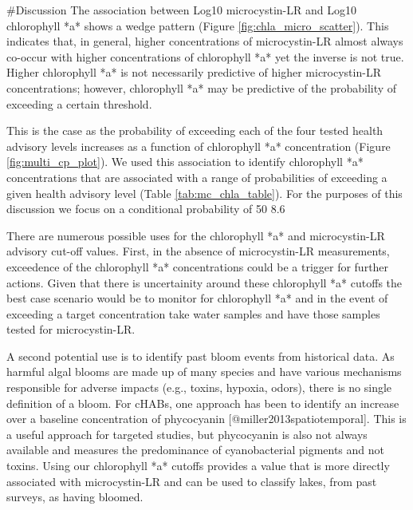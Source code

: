 #Discussion
The association between Log10 microcystin-LR and Log10 chlorophyll *a* shows a wedge pattern (Figure \ref{fig:chla_micro_scatter}).  This indicates that, in general, higher concentrations of microcystin-LR almost always co-occur with higher concentrations of chlorophyll *a* yet the inverse is not true.  Higher chlorophyll *a* is not necessarily predictive of higher microcystin-LR concentrations; however, chlorophyll *a* may be predictive of the probability of exceeding a certain threshold. 

This is the case as the probability of exceeding each of the four tested health advisory levels increases as a function of chlorophyll *a* concentration (Figure \ref{fig:multi_cp_plot}).  We used this association to identify chlorophyll *a* concentrations that are associated with a range of probabilities of exceeding a given health advisory level (Table \ref{tab:mc_chla_table}).  For the purposes of this discussion we focus on a conditional probability of 50%
8.6%

There are numerous possible uses for the chlorophyll *a* and microcystin-LR advisory cut-off values.  First, in the absence of microcystin-LR measurements, exceedence of the chlorophyll *a* concentrations could be a trigger for further actions.  Given that there is uncertainity around these chlorophyll *a* cutoffs the best case scenario would be to monitor for chlorophyll *a* and in the event of exceeding a target concentration take water samples and have those samples tested for microcystin-LR.  

A second potential use is to identify past bloom events from historical data.  As harmful algal blooms are made up of many species and have various mechanisms responsible for adverse impacts (e.g., toxins, hypoxia, odors), there is no single definition of a bloom.  For cHABs, one approach has been to identify an increase over a baseline concentration of phycocyanin [@miller2013spatiotemporal].  This is a useful approach for targeted studies, but phycocyanin is also not always available and measures the predominance of cyanobacterial pigments and not toxins. Using our chlorophyll *a* cutoffs provides a value that is more directly associated with microcystin-LR and can be used to classify lakes, from past surveys, as having bloomed.  

